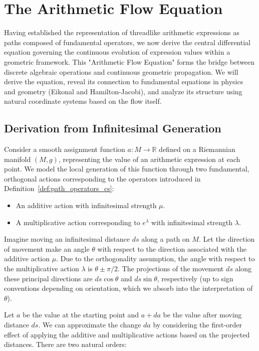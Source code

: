 \documentclass[12pt]{article}
\begin{document}
\section{The Arithmetic Flow Equation}

Having established the representation of threadlike arithmetic expressions as paths composed of fundamental operators, we now derive the central differential equation governing the continuous evolution of expression values within a geometric framework. This "Arithmetic Flow Equation" forms the bridge between discrete algebraic operations and continuous geometric propagation. We will derive the equation, reveal its connection to fundamental equations in physics and geometry (Eikonal and Hamilton-Jacobi), and analyze its structure using natural coordinate systems based on the flow itself.

\subsection{Derivation from Infinitesimal Generation} %

Consider a smooth assignment function \( a: M \to \mathbb{R} \) defined on a Riemannian manifold \( (M, g) \), representing the value of an arithmetic expression at each point. We model the local generation of this function through two fundamental, orthogonal actions corresponding to the operators introduced in Definition~\ref{def:path_operators_cs}:
\begin{itemize}
    \item An additive action with infinitesimal strength \( \mu \).
    \item A multiplicative action corresponding to \( e^\lambda \) with infinitesimal strength \( \lambda \).
\end{itemize}
Imagine moving an infinitesimal distance \( ds \) along a path on \( M \). Let the direction of movement make an angle \( \theta \) with respect to the direction associated with the additive action \( \mu \). Due to the orthogonality assumption, the angle with respect to the multiplicative action \( \lambda \) is \( \theta \pm \pi/2 \). The projections of the movement \( ds \) along these principal directions are \( ds \cos \theta \) and \( ds \sin \theta \), respectively (up to sign conventions depending on orientation, which we absorb into the interpretation of \( \theta \)).

Let \( a \) be the value at the starting point and \( a + da \) be the value after moving distance \( ds \). We can approximate the change \( da \) by considering the first-order effect of applying the additive and multiplicative actions based on the projected distances. There are two natural orders:
\end{document}
